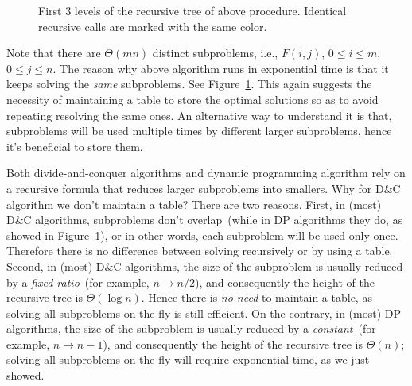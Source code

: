 \begin{figure}[b]
\centering{}
\caption{First 3 levels of the recursive tree of above procedure.
Identical recursive calls are marked with the same color.}
\label{fig:tree}
\end{figure}


Note that there are $\Theta(mn)$ distinct subproblems, i.e., $F(i,j)$, $0\le i
\le m$, $0\le j \le n$. The reason why above
algorithm runs in exponential time is that it keeps solving the \emph{same}
subproblems. See Figure~\ref{fig:tree}. This again suggests the necessity
of maintaining a table to store the optimal solutions so as to avoid
repeating resolving the same ones.
An alternative way to understand it is that, subproblems will be used
multiple times by different larger subproblems, hence it's beneficial
to store them.


Both divide-and-conquer algorithms and dynamic programming algorithm
rely on a recursive formula that reduces larger subproblems into smallers.
Why for D\&C algorithm we don't maintain a table?
There are two reasons.
First, in (most) D\&C algorithms, subproblems don't overlap~(while in DP algorithms they do, as showed in Figure~\ref{fig:tree}), or in other words,
each subproblem will be used only once. Therefore there is no difference between
solving recursively or by using a table.
Second, in (most) D\&C algorithms, the size of the subproblem is usually reduced by a \emph{fixed ratio}~(for example, $n\to n/2$),
and consequently the height of the recursive tree is $\Theta(\log n)$. 
Hence there is \emph{no need} to maintain a table, as solving all subproblems on the fly is still efficient.
On the contrary, in (most) DP algorithms, the size of the subproblem is usually reduced by a \emph{constant}~(for example, $n\to n-1$),
and consequently the height of the recursive tree is $\Theta(n)$;
solving all subproblems on the fly will require exponential-time, as we just showed.

